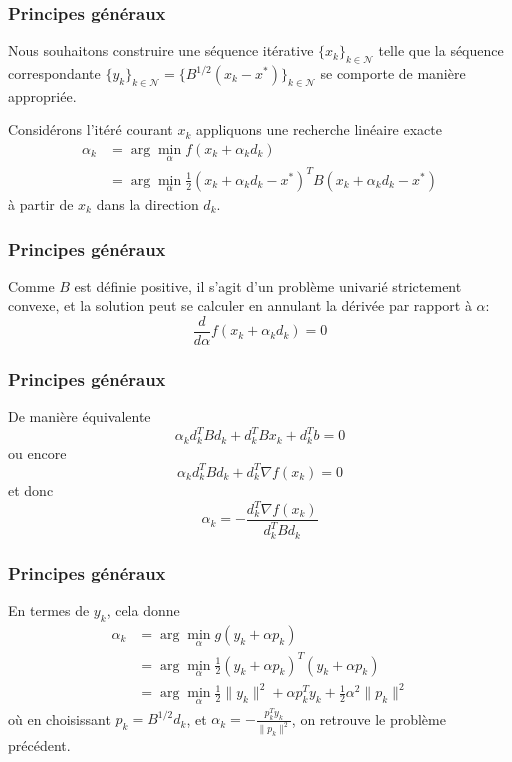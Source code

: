 \documentclass[usepdftitle=false]{beamer}
\def\cN{\mathcal{N}}
\begin{document}
\begin{frame}
\frametitle{Principes généraux}

Nous souhaitons construire une séquence itérative $\lbrace x_k \rbrace_{k \in \cN}$ telle que
la séquence correspondante $\lbrace y_k \rbrace_{k \in \cN} = \lbrace B^{1/2}(x_k - x^*) \rbrace_{k \in \cN}$ se comporte de manière appropriée.

\mbox{}

Considérons l'itéré courant $x_k$ appliquons une recherche linéaire exacte
\begin{align*}
\alpha_k &= \arg \min_{\alpha} f (x_k + \alpha_k d_k) \\
&= \arg \min_{\alpha} \frac{1}{2} (x_k + \alpha_k d_k - x^*)^T B (x_k + \alpha_k d_k - x^*)
\end{align*}
à partir de $x_k$ dans la direction $d_k$.

\end{frame}

\begin{frame}
\frametitle{Principes généraux}

Comme $B$ est définie positive, il s'agit d'un problème univarié strictement convexe, et la solution peut se calculer en annulant la dérivée par rapport à $\alpha$:
$$
\frac{d}{d \alpha} f (x_k + \alpha_k d_k) = 0
$$

\mbox{}

\end{frame}

\begin{frame}
\frametitle{Principes généraux}

De manière équivalente
$$
\alpha_k d_k^T B d_k + d_k^T B x_k + d_k^T b = 0
$$
ou encore
$$
\alpha_k d_k^T B d_k + d_k^T \nabla f(x_k) = 0
$$
et donc
$$
\alpha_k = - \frac{d_k^T \nabla f(x_k)}{d_k^T B d_k}
$$

\end{frame}

\begin{frame}
\frametitle{Principes généraux}

En termes de $y_k$, cela donne
\begin{align*}
\alpha_k &= \arg \min_{\alpha} g(y_k + \alpha p_k) \\
& = \arg \min_{\alpha} \frac{1}{2}(y_k + \alpha p_k)^T(y_k + \alpha p_k) \\
& = \arg \min_{\alpha} \frac{1}{2}\| y_k \|^2 + \alpha p_k^T y_k + \frac{1}{2}\alpha^2 \| p_k \|^2
\end{align*}
où en choisissant $p_k = B^{1/2} d_k$, et $\alpha_k = -\frac{p_k^T y_k}{\| p_k \|^2}$, on retrouve le problème précédent.

\end{frame}
\end{document}
